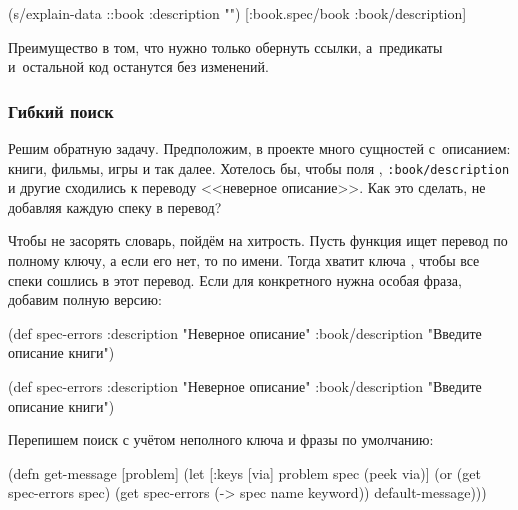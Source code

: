 \else


\begin{clojure}
(s/explain-data ::book {:description ""})
[:book.spec/book :book/description]
\end{clojure}


\fi

Преимущество  в том, что нужно только обернуть ссылки, а~предикаты
и~остальной код останутся без изменений.

\subsubsection*{Гибкий поиск}

Решим обратную задачу. Предположим, в проекте много сущностей с~описанием:
книги, фильмы, игры и так далее. Хотелось бы, чтобы поля
, \texttt{:book/descrip\-tion} и другие сходились к
переводу <<неверное описание>>. Как это сделать, не добавляя каждую спеку в
перевод?

Чтобы не засорять словарь, пойдём на хитрость. Пусть функция ищет перевод по
полному ключу, а если его нет, то по имени. Тогда хватит ключа
, чтобы все спеки сошлись в этот перевод. Если для
конкретного  нужна особая фраза, добавим полную
версию:

\ifnarrow

\begin{clojure}
(def spec-errors
  {:description
   "Неверное описание"
   :book/description
   "Введите описание книги"})
\end{clojure}

\else

\begin{clojure}
(def spec-errors
  {:description "Неверное описание"
   :book/description "Введите описание книги"})
\end{clojure}

\fi

Перепишем поиск с учётом неполного ключа и фразы по умолчанию:

\ifnarrow


\begin{clojure}
(defn get-message
  [problem]
  (let [{:keys [via]} problem
        spec (peek via)]
    (or (get spec-errors spec)
        (get spec-errors
          (-> spec name keyword))
        default-message)))
\end{clojure}


\else


